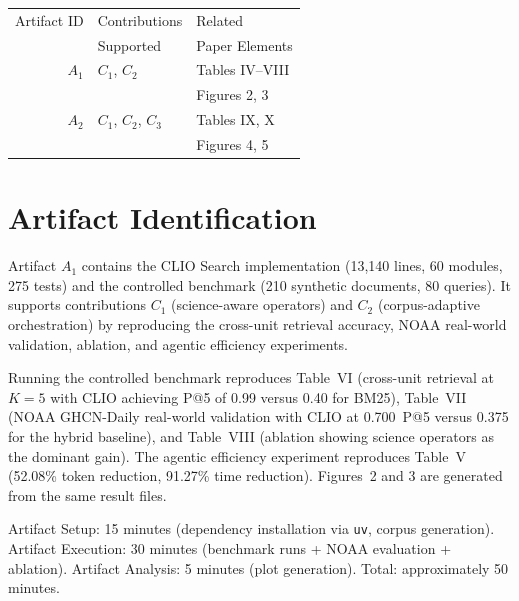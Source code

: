 \documentclass[conference]{IEEEtran}
\begin{document}
\begin{center}
\begin{tabular}{rll}
\toprule
Artifact ID  &  Contributions &  Related \\
             &  Supported     &  Paper Elements \\
\midrule
$A_1$   &  $C_1$, $C_2$ & Tables IV--VIII \\
        &               & Figures 2, 3 \\
\midrule
$A_2$   &  $C_1$, $C_2$, $C_3$ & Tables IX, X \\
        &                      & Figures 4, 5 \\
\bottomrule
\end{tabular}
\end{center}


\section{Artifact Identification}

\newartifact

\artrel

Artifact $A_1$ contains the CLIO Search implementation (13{,}140 lines, 60 modules, 275 tests) and the controlled benchmark (210 synthetic documents, 80 queries). It supports contributions $C_1$ (science-aware operators) and $C_2$ (corpus-adaptive orchestration) by reproducing the cross-unit retrieval accuracy, NOAA real-world validation, ablation, and agentic efficiency experiments.

\artexp

Running the controlled benchmark reproduces Table~VI (cross-unit retrieval at $K{=}5$ with CLIO achieving P@5 of 0.99 versus 0.40 for BM25), Table~VII (NOAA GHCN-Daily real-world validation with CLIO at 0.700~P@5 versus 0.375 for the hybrid baseline), and Table~VIII (ablation showing science operators as the dominant gain). The agentic efficiency experiment reproduces Table~V (52.08\% token reduction, 91.27\% time reduction). Figures~2 and 3 are generated from the same result files.

\arttime

Artifact Setup: 15 minutes (dependency installation via \texttt{uv}, corpus generation).
Artifact Execution: 30 minutes (benchmark runs + NOAA evaluation + ablation).
Artifact Analysis: 5 minutes (plot generation).
Total: approximately 50 minutes.
\end{document}
